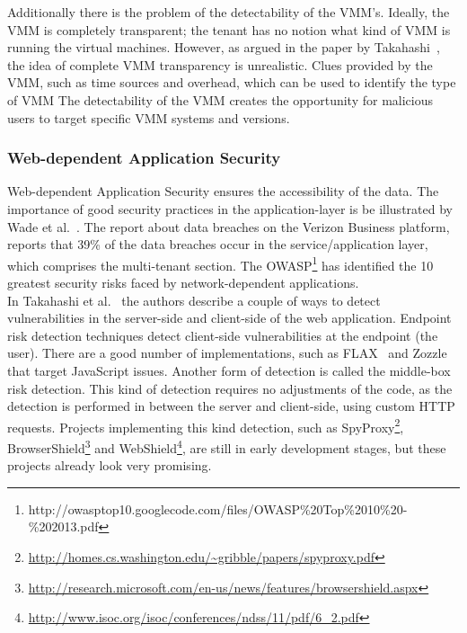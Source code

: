 Additionally there is the problem of the detectability of the \ac{VMM}’s. Ideally, the \ac{VMM} is completely transparent; the tenant has no notion what kind of \ac{VMM} is running the virtual machines. 
However, as argued in the paper by Takahashi~\cite{Takahashi2012Security}, the idea of complete \ac{VMM} transparency is unrealistic. 
Clues provided by the \ac{VMM}, such as time sources and overhead, which can be used to identify the type of \ac{VMM}
The detectability of the \ac{VMM} creates the opportunity for malicious users to target specific \ac{VMM} systems and versions.

\subsubsection{Web-dependent Application Security}
Web-dependent Application Security ensures the accessibility of the data. 
The importance of good security practices in the application-layer is be illustrated by Wade et al.~\cite{Wade2008Security}.
The report about data breaches on the Verizon Business platform, reports that 39\% of the data breaches occur in the service/application layer, which comprises the multi-tenant section. The \ac{OWASP}\footnote{http://owasptop10.googlecode.com/files/OWASP\%20Top\%2010\%20-\%202013.pdf} has identified the 10 greatest security risks faced by network-dependent applications.\\

In Takahashi et al.~\cite{Takahashi2012Security} the authors describe a couple of ways to detect vulnerabilities in the server-side and client-side of the web application. 
Endpoint risk detection techniques detect client-side vulnerabilities at the endpoint (the user). 
There are a good number of implementations, such as FLAX~\cite{saxena10kudzu} and Zozzle~\cite{curtsinger2011zozzle} that target JavaScript issues. 
Another form of detection is called the middle-box risk detection. 
This kind of detection requires no adjustments of the code, as the detection is performed in between the server and client-side, using custom HTTP requests. 
Projects implementing this kind detection, such as SpyProxy\footnote{\url{http://homes.cs.washington.edu/~gribble/papers/spyproxy.pdf}}, BrowserShield\footnote{\url{http://research.microsoft.com/en-us/news/features/browsershield.aspx}} and WebShield\footnote{\url{http://www.isoc.org/isoc/conferences/ndss/11/pdf/6_2.pdf}}, are still in early development stages, but these projects already look very promising.

